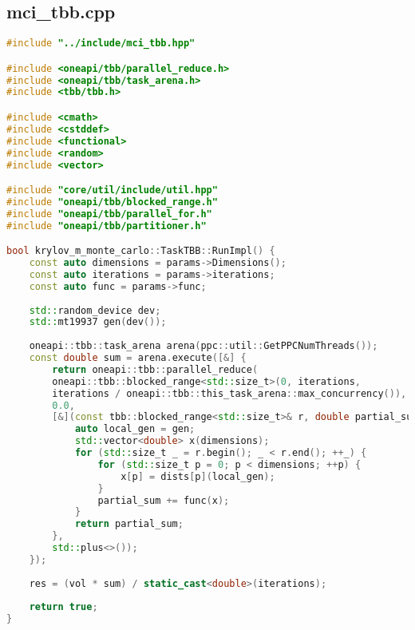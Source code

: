 \documentclass[a4paper,12pt]{article}
\begin{document}
\subsection{mci\_tbb.cpp}
\begin{lstlisting}[language=C++]
#include "../include/mci_tbb.hpp"

#include <oneapi/tbb/parallel_reduce.h>
#include <oneapi/tbb/task_arena.h>
#include <tbb/tbb.h>

#include <cmath>
#include <cstddef>
#include <functional>
#include <random>
#include <vector>

#include "core/util/include/util.hpp"
#include "oneapi/tbb/blocked_range.h"
#include "oneapi/tbb/parallel_for.h"
#include "oneapi/tbb/partitioner.h"

bool krylov_m_monte_carlo::TaskTBB::RunImpl() {
	const auto dimensions = params->Dimensions();
	const auto iterations = params->iterations;
	const auto func = params->func;
	
	std::random_device dev;
	std::mt19937 gen(dev());
	
	oneapi::tbb::task_arena arena(ppc::util::GetPPCNumThreads());
	const double sum = arena.execute([&] {
		return oneapi::tbb::parallel_reduce(
		oneapi::tbb::blocked_range<std::size_t>(0, iterations,
		iterations / oneapi::tbb::this_task_arena::max_concurrency()),
		0.0,
		[&](const tbb::blocked_range<std::size_t>& r, double partial_sum) {
			auto local_gen = gen;
			std::vector<double> x(dimensions);
			for (std::size_t _ = r.begin(); _ < r.end(); ++_) {
				for (std::size_t p = 0; p < dimensions; ++p) {
					x[p] = dists[p](local_gen);
				}
				partial_sum += func(x);
			}
			return partial_sum;
		},
		std::plus<>());
	});
	
	res = (vol * sum) / static_cast<double>(iterations);
	
	return true;
}
\end{lstlisting}
\end{document}
